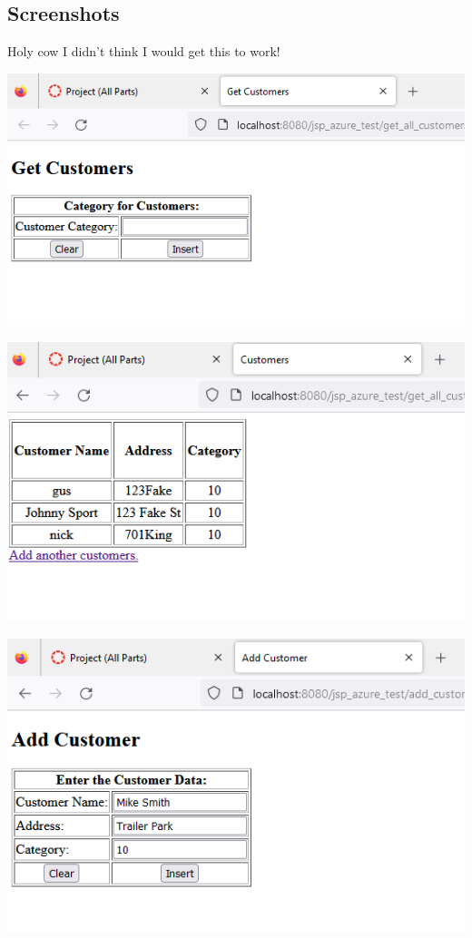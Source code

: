 \documentclass[11pt]{article}
\begin{document}
\subsection{Screenshots}
Holy cow I didn't think I would get this to work!

\includegraphics[width = \textwidth]{web1.png}

\includegraphics[width = \textwidth]{web2.png}

\includegraphics[width = \textwidth]{web3.png}
\end{document}
